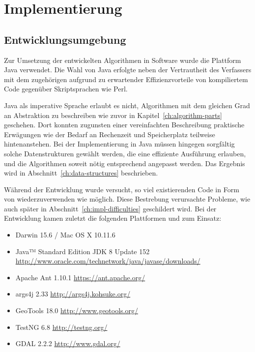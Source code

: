 \documentclass[../main/thesis.tex]{subfiles}
\begin{document}
\chapter{Implementierung}
\label{ch:impl}

\section{Entwicklungsumgebung}

Zur Umsetzung der entwickelten Algorithmen in Software wurde die Plattform Java verwendet.
Die Wahl von Java erfolgte neben der Vertrautheit des Verfassers mit dem zugehörigen  aufgrund zu erwartender Effizienzvorteile von kompiliertem Code gegenüber Skriptsprachen wie Perl.

Java als imperative Sprache erlaubt es nicht, Algorithmen mit dem gleichen Grad an Abstraktion zu beschreiben wie zuvor in Kapitel~\ref{ch:algorithm-parts} geschehen.
Dort konnten zugunsten einer vereinfachten
Beschreibung praktische Erwägungen wie der Bedarf an Rechenzeit und Speicherplatz teilweise hintenanstehen.
Bei der Implementierung in Java müssen hingegen sorgfältig solche Datenstrukturen gewählt werden, die eine effiziente Ausführung erlauben, und die Algorithmen soweit nötig entsprechend angepasst werden.
Das Ergebnis wird in Abschnitt~\ref{ch:data-structures} beschrieben.

Während der Entwicklung wurde versucht, so viel existierenden Code in Form von  wiederzuverwenden wie möglich.
Diese Bestrebung verursachte Probleme, wie auch später in Abschnitt~\ref{ch:impl-difficulties} geschildert wird.
Bei der Entwicklung kamen zuletzt die folgenden Plattformen und  zum Einsatz:

\begin{itemize}[nosep]
	\item Darwin 15.6 / Mac OS X 10.11.6
	\item Java™ Standard Edition JDK 8 Update 152\\ \url{http://www.oracle.com/technetwork/java/javase/downloads/}
	\item Apache Ant 1.10.1 \quad \url{https://ant.apache.org/}
	\item args4j 2.33 \quad \url{http://args4j.kohsuke.org/}
	\item GeoTools 18.0 \quad \url{http://www.geotools.org/}
	\item TestNG 6.8 \quad \url{http://testng.org/}
	\item GDAL 2.2.2 \quad \url{http://www.gdal.org/}
\end{itemize}
\end{document}
